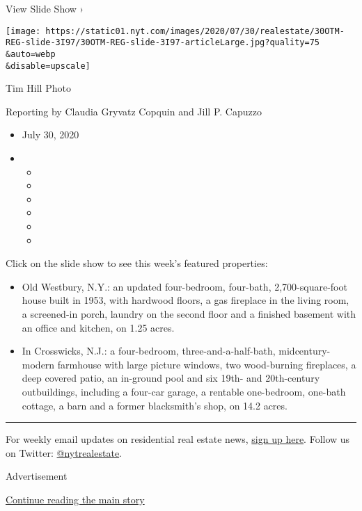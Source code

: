View Slide Show ›

\texttt{[image: https://static01.nyt.com/images/2020/07/30/realestate/30OTM-REG-slide-3I97/30OTM-REG-slide-3I97-articleLarge.jpg?quality=75\\\&auto=webp\\\&disable=upscale]}

Tim Hill Photo

Reporting by Claudia Gryvatz Copquin and Jill P. Capuzzo

\begin{itemize}
\item
  July 30, 2020
\item
  \begin{itemize}
  \item
  \item
  \item
  \item
  \item
  \item
  \end{itemize}
\end{itemize}

Click on the slide show to see this week's featured properties:

\begin{itemize}
\item
  Old Westbury, N.Y.: an updated four-bedroom, four-bath,
  2,700-square-foot house built in 1953, with hardwood floors, a gas
  fireplace in the living room, a screened-in porch, laundry on the
  second floor and a finished basement with an office and kitchen, on
  1.25 acres.
\item
  In Crosswicks, N.J.: a four-bedroom, three-and-a-half-bath,
  midcentury-modern farmhouse with large picture windows, two
  wood-burning fireplaces, a deep covered patio, an in-ground pool and
  six 19th- and 20th-century outbuildings, including a four-car garage,
  a rentable one-bedroom, one-bath cottage, a barn and a former
  blacksmith's shop, on 14.2 acres.
\end{itemize}

\begin{center}\rule{0.5\linewidth}{\linethickness}\end{center}

For weekly email updates on residential real estate news,
\href{http://www.nytimes.com/newsletters/realestate/}{sign up here}.
Follow us on Twitter:
\href{https://twitter.com/nytrealestate}{@nytrealestate}.

Advertisement

\protect\hyperlink{after-bottom}{Continue reading the main story}

